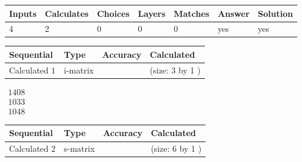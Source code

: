 \documentclass[12pt]{article}
\begin{document}
 
 
\noindent{}
 
 

 
 
 
\noindent{}
 
 

 
 
\noindent{}
 
 

 
\vspace{0.3in}
   
   
   
   
\noindent\begin{tabular}{|l|l|l|l|l|l|l|}
 \hline
Inputs & Calculates & Choices & Layers & Matches & Answer & Solution \\ \hline
 4  & 
 2  & 
 0
  & 
 0  & 
 0  & 
  yes & 
  yes 
  \\ \hline
 \end{tabular}
   
   
   
   
\noindent{}
   
   
  
  
\noindent\begin{tabular}{|l|l|l|l|}
\hline
 Sequential & Type & Accuracy & Calculated \\ 
\hline
 
 
  Calculated $  1 $ & i-matrix &  & 
 (size:  3  by  1 )
 \\  \hline  
 \end{tabular}
   
   
$\begin{array}{
 c
 }
 1408  \\ 
 1033  \\ 
 1048
 \end{array}  $ 
  
  
\noindent\begin{tabular}{|l|l|l|l|}
\hline
 Sequential & Type & Accuracy & Calculated \\ 
\hline
 
 
  Calculated $  2 $ & s-matrix & & 
 (size:  6  by  1 )
 \\  \hline  
 \end{tabular}
   
\end{document}
